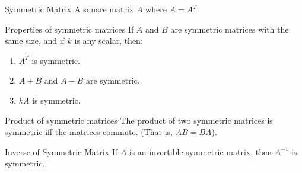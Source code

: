 \documentclass[\main/notes.tex]{subfiles}
\begin{document}
			\begin{definition}{Symmetric Matrix}
				A square matrix $A$ where $A = A^{T}$.
			\end{definition}
			\begin{sidenote}{Properties of symmetric matrices}
				If $A$ and $B$ are symmetric matrices with the same size, and if $k$ is any scalar, then:
				\begin{enumerate}[label=(\alph*), nosep]
					\item $A^{T}$ is symmetric.
					\item $A + B$ and $A - B$ are symmetric.
					\item $kA$ is symmetric.
				\end{enumerate}
			\end{sidenote}
			\begin{theorem}{Product of symmetric matrices}
				The product of two symmetric matrices is symmetric iff the matrices commute. (That is, $AB = BA$).
			\end{theorem}
			\begin{theorem}{Inverse of Symmetric Matrix}
				If $A$ is an invertible symmetric matrix, then $A^{-1}$ is symmetric.
			\end{theorem}

\end{document}
